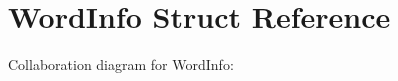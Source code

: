 \hypertarget{structWordInfo}{}\section{Word\+Info Struct Reference}
\label{structWordInfo}


Collaboration diagram for Word\+Info\+:
